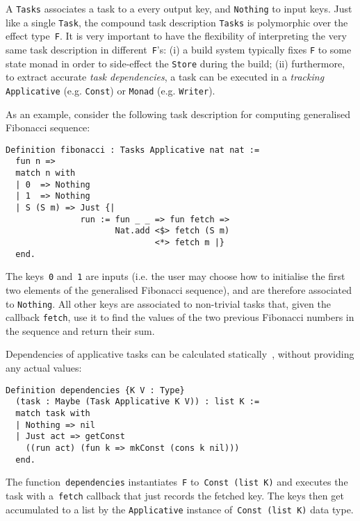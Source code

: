 \documentclass[sigplan,review]{acmart}\settopmatter{printfolios=true,printccs=false,printacmref=false}
\newcommand{\hs}{\texttt}
\newcommand{\coq}{\texttt}
\begin{document}
A \hs{Tasks} associates a task to a every output key, and \hs{Nothing} to input
keys. Just like a single \hs{Task}, the compound task description \hs{Tasks} is
polymorphic over the effect type~\hs{F}. It is very important to have the
flexibility of interpreting the very same task description in
different~\hs{F}'s: (i) a build system typically fixes \hs{F} to some state
monad in order to side-effect the \hs{Store} during the build; (ii) furthermore,
to extract accurate \emph{task dependencies}, a task can be executed in a
\emph{tracking} \hs{Applicative} (e.g. \hs{Const}) or \hs{Monad}
(e.g. \hs{Writer}).

As an example, consider the following task description for computing generalised
Fibonacci sequence:

\vspace{-1mm}
\begin{verbatim}
Definition fibonacci : Tasks Applicative nat nat :=
  fun n =>
  match n with
  | 0  => Nothing
  | 1  => Nothing
  | S (S m) => Just {|
               run := fun _ _ => fun fetch =>
                      Nat.add <$> fetch (S m)
                              <*> fetch m |}
  end.
\end{verbatim}
\vspace{-1mm}

\noindent
The keys~\coq{0} and~\coq{1} are inputs (i.e. the user may choose
how to initialise the first two elements of the generalised Fibonacci sequence),
and are therefore associated to \hs{Nothing}. All other keys are associated to
non-trivial tasks that, given the callback \hs{fetch}, use it to find the values
of the two previous Fibonacci numbers in the sequence and return their sum.

Dependencies of applicative tasks can be calculated
statically~\cite{free-applicatives}, without providing any actual values:

\vspace{-1mm}
\begin{verbatim}
Definition dependencies {K V : Type}
  (task : Maybe (Task Applicative K V)) : list K :=
  match task with
  | Nothing => nil
  | Just act => getConst
    ((run act) (fun k => mkConst (cons k nil)))
  end.
\end{verbatim}
\vspace{-1mm}

\noindent
The function~\hs{dependencies} instantiates~\hs{F} to~\hs{Const (list K)} and
executes the task with a~\hs{fetch} callback that just records the fetched key.
The keys then get accumulated to a list by the \hs{Applicative} instance
of~\hs{Const (list K)} data type.
\end{document}

